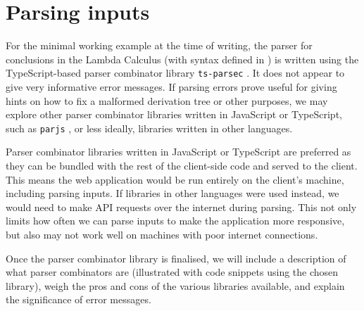 \section{Parsing inputs}
For the minimal working example at the time of writing, the parser for conclusions in the Lambda Calculus (with syntax defined in ) is written using the TypeScript-based parser combinator library \texttt{ts-parsec} \cite{tsparsec}. It does not appear to give very informative error messages. If parsing errors prove useful for giving hints on how to fix a malformed derivation tree or other purposes, we may explore other parser combinator libraries written in JavaScript or TypeScript, such as \texttt{parjs} \cite{parjs}, or less ideally, libraries written in other languages.

Parser combinator libraries written in JavaScript or TypeScript are preferred as they can be bundled with the rest of the client-side code and served to the client. This means the web application would be run entirely on the client's machine, including parsing inputs. If libraries in other languages were used instead, we would need to make API requests over the internet during parsing. This not only limits how often we can parse inputs to make the application more responsive, but also may not work well on machines with poor internet connections.

Once the parser combinator library is finalised, we will include a description of what parser combinators are (illustrated with code snippets using the chosen library), weigh the pros and cons of the various libraries available, and explain the significance of error messages.


